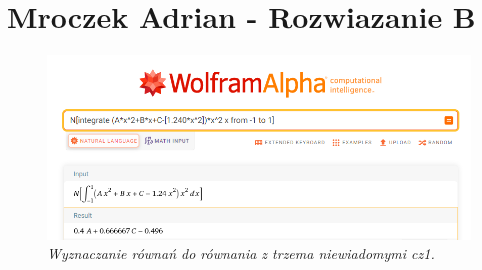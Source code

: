 \documentclass[12pt,oneside,a4paper]{book} %
\begin{document}





\chapter{Mroczek Adrian - Rozwiazanie B  }


\begin{figure}[h]
\begin{center} 
\includegraphics[scale=0.65]{./images/01a.PNG} 
\caption{\textit{Wyznaczanie równań do równania z trzema niewiadomymi cz1. }\newline }
\label{rys:logoup}
\end{center}
\end{figure}
\end{document}
